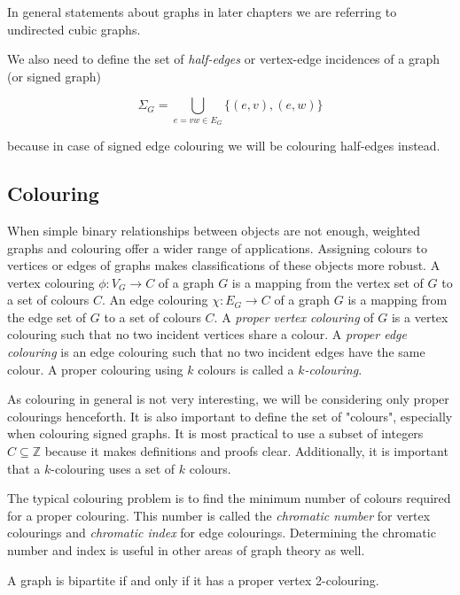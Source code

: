 In general statements about graphs in later chapters we are referring to undirected cubic graphs.

We also need to define the set of \textit{half-edges} or vertex-edge incidences of a graph (or signed graph)

$$\Sigma _{G} = \bigcup _{e = vw \in E _{G}} \{(e, v), (e, w) \}$$

because in case of signed edge colouring we will be colouring half-edges instead.

\subsection{Colouring}

When simple binary relationships between objects are not enough, weighted graphs and colouring offer a wider range of applications. Assigning colours to vertices or edges of graphs makes classifications of these objects more robust.
A vertex colouring $\phi : V_G \rightarrow C$ of a graph $G$ is a mapping from the vertex set of $G$ to a set of colours $C$. An edge colouring $\chi : E_G \rightarrow C$ of a graph $G$ is a mapping from the edge set of $G$ to a set of colours $C$.
A \textit{proper vertex colouring} of $G$ is a vertex colouring such that no two incident vertices share a colour. A \textit{proper edge colouring} is an edge colouring such that no two incident edges have the same colour. A proper colouring using $k$ colours is called a \textit{$k$-colouring}.

As colouring in general is not very interesting, we will be considering only proper colourings henceforth. It is also important to define the set of "colours", especially when colouring signed graphs. It is most practical to use a subset of integers $C \subseteq \mathbb{Z}$ because it makes definitions and proofs clear. Additionally, it is important that a $k$-colouring uses a set of $k$ colours.

The typical colouring problem is to find the minimum number of colours required for a proper colouring. This number is called the \textit{chromatic number} for vertex colourings and \textit{chromatic index} for edge colourings. Determining the chromatic number and index is useful in other areas of graph theory as well.

\begin{theorem}\label{th:bipartite}
    A graph is bipartite if and only if it has a proper vertex 2-colouring.
\end{theorem}

